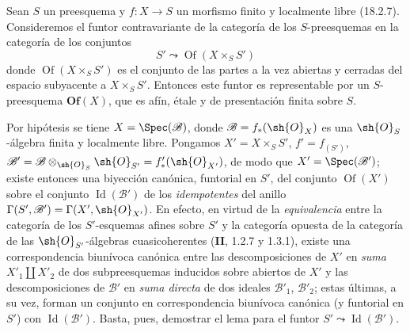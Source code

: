 \begin{lemma}[18.5.3]
\label{IV.18.5.3}
Sean $S$ un preesquema y $f:X\to S$ un morfismo finito y localmente libre \textup{(18.2.7)}. Consideremos el funtor contravariante de la categoría de los $S$-preesquemas en la categoría de los conjuntos
\begin{equation}
  S'\leadsto\operatorname{Of}(X\times_S S')
  \tag{18.5.3.1}\label{IV.18.5.3.1}
\end{equation}
donde $\operatorname{Of}(X\times_S S')$ es el conjunto de las partes a la vez abiertas y cerradas del espacio subyacente a $X\times_S S'$. Entonces este funtor es representable por un $S$-preesquema $\mathbf{Of}(X)$, que es afín, étale y de presentación finita sobre $S$.
\end{lemma}


Por hipótesis se tiene $X=\Spec(\mathscr B)$, donde $\mathscr B=f_*(\sh{O}_X)$ es una $\sh{O}_S$-álgebra finita y localmente libre. Pongamos $X'=X\times_S S'$, $f'=f_{(S')}$, $\mathscr B'=\mathscr B\otimes_{\sh{O}_S}\sh{O}_{S'}=f'_*(\sh{O}_{X'})$, de modo que $X'=\Spec(\mathscr B')$; existe entonces una biyección canónica, funtorial en $S'$, del conjunto $\operatorname{Of}(X')$ sobre el conjunto $\operatorname{Id}(\mathscr B')$ de los \emph{idempotentes} del anillo $\Gamma(S',\mathscr B')=\Gamma(X',\sh{O}_{X'})$. En efecto, en virtud de la \emph{equivalencia} entre la categoría de los $S'$-esquemas afines sobre $S'$ y la categoría opuesta de la categoría de las $\sh{O}_{S'}$-álgebras cuasicoherentes (\textbf{II}, 1.2.7 y 1.3.1), existe una correspondencia biunívoca canónica entre las descomposiciones de $X'$ en \emph{suma} $X'_1\amalg X'_2$ de dos subpreesquemas inducidos sobre abiertos de $X'$ y las descomposiciones de $\mathscr B'$ en \emph{suma directa} de dos ideales $\mathscr B'_1$, $\mathscr B'_2$; estas últimas, a su vez, forman un conjunto en correspondencia biunívoca canónica (y funtorial en $S'$) con $\operatorname{Id}(\mathscr B')$. Basta, pues, demostrar el lema para el funtor $S'\leadsto\operatorname{Id}(\mathscr B')$.

